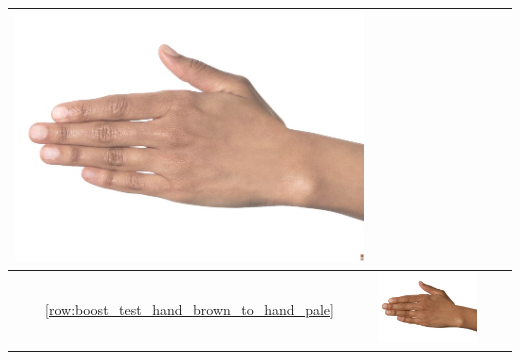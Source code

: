 \begin{longtable}{|c||c|c|c|}
\begin{minipage}{.29\textwidth}
    \includegraphics[width=\textwidth,height=\textheight,keepaspectratio]{../rc_test/outputs/20170516_boost_test/hand_brown_to_hand_light.jpg}
  \end{minipage} \\
  \hline  \ref{row:boost_test_hand_brown_to_hand_pale} &
  \begin{minipage}{.29\textwidth}
    \includegraphics[width=\textwidth,height=\textheight,keepaspectratio]{../inputs/hand_brown.jpg}
  \end{minipage} & 
  \begin{minipage}{.29\textwidth}

\end{minipage}
\end{longtable}
